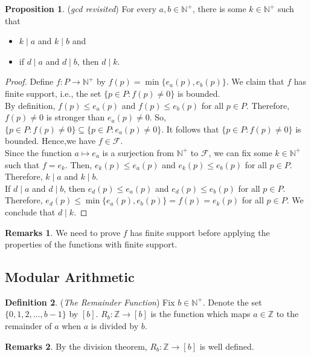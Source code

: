 \documentclass[14pt]{article}
\theoremstyle{definition}
\newtheorem*{remark}{Remarks}
\newtheorem{definition}{Definition}[subsection]
\newtheorem{proposition}[definition]{Proposition}
\begin{document}
\vspace{2mm} 


\begin{proposition}
    (\textit{gcd revisited}) For every $a,b \in \mathbb{N}^+$, there is some $k\in \mathbb{N}^+$ such that 
    \begin{itemize}
        \item $k\mid a$ and $k\mid b$ and
        \item if $d\mid a$ and $d\mid b$, then $d\mid k$. 
    \end{itemize}
\end{proposition}
\begin{proof}
    Define $f\colon P\rightarrow \mathbb{N}^+$ by $f(p)=\min\{e_a(p), e_b(p)\}$. We claim that $f$ has finite support, i.e., the set $\{p\in P\colon f(p)\not=0\}$ is bounded.\\
    By definition, $f(p)\leq e_a(p)$ and  $f(p)\leq e_b(p)$ for all $p\in P$. Therefore, $f(p)\not=0$ is stronger than $e_a(p)\not=0$. So, $\{p\in P\colon f(p)\not=0\}\subseteq \{p\in P\colon e_a(p)\not=0\}$. It follows that $\{p\in P\colon f(p)\not=0\}$ is bounded. Hence,we have $f\in \mathcal{F}$.\\
    Since the function $a\mapsto e_a$ is a surjection from $\mathbb{N}^+$ to $\mathcal{F}$, we can fix some $k\in \mathbb{N}^+$ such that $f=e_k$. Then, $e_k(p)\leq e_a(p)$ and $e_k(p)\leq e_b(p)$ for all $p\in P$. Therefore, $k\mid a$ and $k\mid b$.\\
    If $d\mid a$ and $d\mid b$, then $e_d(p)\leq e_a(p)$ and $e_d(p)\leq e_b(p)$ for all $p\in P$. Therefore, $e_d(p)\leq \min\{e_a(p), e_b(p)\}=f(p)=e_k(p)$ for all $p\in P$. We conclude that $d\mid k$.
\end{proof}

\begin{remark}
    We need to prove $f$ has finite support before applying the properties of the functions with finite support.
\end{remark}

\vspace{6mm} %

\subsection{Modular Arithmetic}
\begin{definition}
    (\textit{The Remainder Function}) Fix $b\in\mathbb{N}^+$. Denote the set $\{0,1,2,..., b-1\}$ by $[b]$.  $R_b\colon \mathbb{Z}\rightarrow [b]$ is the function which maps $a\in \mathbb{Z}$ to the remainder of $a$ when $a$ is divided by $b$.
\end{definition}
\begin{remark}
    By the division theorem, $R_b\colon \mathbb{Z}\rightarrow [b]$ is well defined.
\end{remark}
\end{document}
